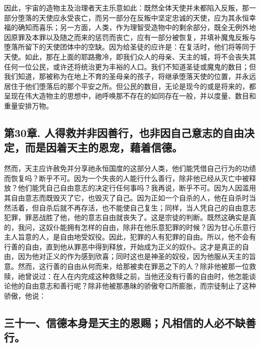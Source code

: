 因此，宇宙的造物主及治理者天主乐意如此：既然全体天使并未都陷入反叛，那一部分堕落的天使应永受丧亡，而另一部分在反叛中坚定忠诚的天使，应为其永恒幸福的确知而喜乐；另一方面，人类，作为理智受造物中的剩余部分，既全无例外地因原罪及本罪以及随之而来的惩罚而丧亡，应有一部分被恢复，并填补魔鬼反叛与堕落所留下的天使团体中的空缺。因为给圣徒的应许是：在复活时，他们将等同于天使。如此，那在上面的耶路撒冷，即我们众人的母亲、天主的城，将不会丧失其任何一位公民，或许还将统治更为丰裕的人口。我们不知道圣徒或魔鬼的数目；但我们知道，那被称为在地上不育的圣母亲的孩子，将继承堕落天使的位置，并永远居住于他们堕落后的那个平安之所。但公民的数目，无论是现今的或是将来的，都呈现在伟大造物主的思想中，祂呼唤那不存在的如同存在一般，并以度量、数目和重量安排万物。\par


\subsection{第30章. 人得救并非因善行，也非因自己意志的自由决定，而是因着天主的恩宠，藉着信德。}

然而，天主应许赦免并分享祂永恒国度的这部分人类，他们能凭借自己行为的功绩而恢复吗？断乎不可。因为一个失丧的人能行什么善行，除非他已经从灭亡中被释放？他们能凭自己自由意志的决定行任何事吗？我再说，断乎不可。因为人因滥用其自由意志而既毁灭了它，也毁灭了自己。因为正如一个自杀的人，他在自杀时当然活着，但自杀后就不再存活，也不能使自己复生；同样，当人凭自己的自由意志犯罪，罪恶战胜了他，他的意志自由就丧失了。这是宗徒的判断。既然这确实是真的，我问，这奴仆能拥有怎样的自由，除非在他乐意犯罪的时候？因为甘心乐意行主人旨意的人，是自由地受奴役。因此，犯罪的人有犯罪的自由。所以，他不会有行善的自由，直到他从罪恶中得到释放，开始成为正义的奴仆。这才是真正的自由，因为他对正义的作为感到欣喜；同时这也是神圣的奴役，因为他服从天主的旨意。然而，这行善的自由从何而来，给那被卖在罪恶之下的人？除非他被那一位救赎，祂曾说过：在人在内完成这种救赎之前，当他还没有行善的自由时，他怎能谈论他的自由意志和善行呢？除非他被那愚昧的骄傲夸口所膨胀，而宗徒制止了这种骄傲，他说：\par


\subsection{三十一、信德本身是天主的恩赐；凡相信的人必不缺善行。}

